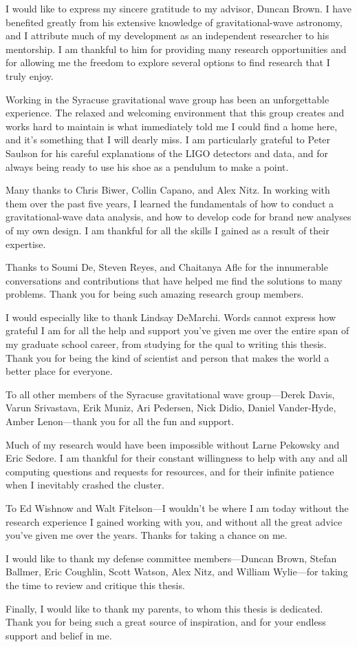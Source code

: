 I would like to express my sincere gratitude to my advisor, Duncan Brown. I have benefited greatly from his extensive knowledge of gravitational-wave astronomy, and I attribute much of my development as an independent researcher to his mentorship. I am thankful to him for providing many research opportunities and for allowing me the freedom to explore several options to find research that I truly enjoy.

Working in the Syracuse gravitational wave group has been an unforgettable experience. The relaxed and welcoming environment that this group creates and works hard to maintain is what immediately told me I could find a home here, and it's something that I will dearly miss. I am particularly grateful to Peter Saulson for his careful explanations of the LIGO detectors and data, and for always being ready to use his shoe as a pendulum to make a point.

Many thanks to Chris Biwer, Collin Capano, and Alex Nitz. In working with them over the past five years, I learned the fundamentals of how to conduct a gravitational-wave data analysis, and how to develop code for brand new analyses of my own design. I am thankful for all the skills I gained as a result of their expertise.

Thanks to Soumi De, Steven Reyes, and Chaitanya Afle for the innumerable conversations and contributions that have helped me find the solutions to many problems. Thank you for being such amazing research group members.

I would especially like to thank Lindsay DeMarchi. Words cannot express how grateful I am for all the help and support you've given me over the entire span of my graduate school career, from studying for the qual to writing this thesis. Thank you for being the kind of scientist and person that makes the world a better place for everyone.

To all other members of the Syracuse gravitational wave group---Derek Davis, Varun Srivastava, Erik Muniz, Ari Pedersen, Nick Didio, Daniel Vander-Hyde, Amber Lenon---thank you for all the fun and support.

Much of my research would have been impossible without Larne Pekowsky and Eric Sedore. I am thankful for their constant willingness to help with any and all computing questions and requests for resources, and for their infinite patience when I inevitably crashed the cluster.

To Ed Wishnow and Walt Fitelson---I wouldn't be where I am today without the research experience I gained working with you, and without all the great advice you've given me over the years. Thanks for taking a chance on me.

I would like to thank my defense committee members---Duncan Brown, Stefan Ballmer, Eric Coughlin, Scott Watson, Alex Nitz, and William Wylie---for taking the time to review and critique this thesis.

Finally, I would like to thank my parents, to whom this thesis is dedicated. Thank you for being such a great source of inspiration, and for your endless support and belief in me.
